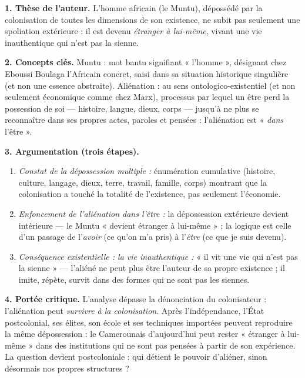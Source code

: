 \documentclass[11pt]{article}
\newcommand{\cle}[1]{{\popxbold\color{popdark}#1}}
\begin{document}
\begin{corrige}
\textbf{1. Thèse de l'auteur.} L'homme africain (le Muntu), dépossédé par la colonisation de toutes les dimensions de son existence, ne subit pas seulement une spoliation extérieure : il est devenu \emph{étranger à lui-même}, vivant une vie inauthentique qui n'est pas la sienne.

\textbf{2. Concepts clés.} \cle{Muntu} : mot bantu signifiant « l'homme », désignant chez Eboussi Boulaga l'Africain concret, saisi dans sa situation historique singulière (et non une essence abstraite). \cle{Aliénation} : au sens ontologico-existentiel (et non seulement économique comme chez Marx), processus par lequel un être perd la possession de soi — histoire, langue, dieux, corps — jusqu'à ne plus se reconnaître dans ses propres actes, paroles et pensées : l'aliénation est « \emph{dans} l'être ».

\textbf{3. Argumentation (trois étapes).}
\begin{enumerate}
    \item \emph{Constat de la dépossession multiple :} énumération cumulative (histoire, culture, langage, dieux, terre, travail, famille, corps) montrant que la colonisation a touché la totalité de l'existence, pas seulement l'économie.
    \item \emph{Enfoncement de l'aliénation dans l'être :} la dépossession extérieure devient intérieure — le Muntu « devient étranger à lui-même » ; la logique est celle d'un passage de l'\emph{avoir} (ce qu'on m'a pris) à l'\emph{être} (ce que je suis devenu).
    \item \emph{Conséquence existentielle : la vie inauthentique :} « il vit une vie qui n'est pas la sienne » — l'aliéné ne peut plus être l'auteur de sa propre existence ; il imite, répète, survit dans des formes qui ne sont pas les siennes.
\end{enumerate}

\textbf{4. Portée critique.} L'analyse dépasse la dénonciation du colonisateur : l'aliénation peut \emph{survivre à la colonisation}. Après l'indépendance, l'État postcolonial, ses élites, son école et ses techniques importées peuvent reproduire la même dépossession : le Camerounais d'aujourd'hui peut rester « étranger à lui-même » dans des institutions qui ne sont pas pensées à partir de son expérience. La question devient postcoloniale : qui détient le pouvoir d'aliéner, sinon désormais nos propres structures ?


\end{corrige}
\end{document}
